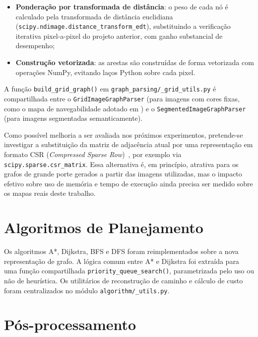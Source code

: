 \documentclass[
    12pt,
    openright,
    oneside,
    a4paper,
    english,
    brazil
]{abntex2}
\begin{document}
\begin{itemize}
    \item \textbf{Ponderação por transformada de distância}: o peso de cada nó é calculado pela transformada de distância euclidiana (\texttt{scipy.ndimage.distance\_transform\_edt}), substituindo a verificação iterativa pixel-a-pixel do projeto anterior, com ganho substancial de desempenho;
    \item \textbf{Construção vetorizada}: as arestas são construídas de forma vetorizada com operações NumPy, evitando laços Python sobre cada pixel.
\end{itemize}

A função \texttt{build\_grid\_graph()} em \texttt{graph\_parsing/\_grid\_utils.py} é compartilhada entre o \texttt{GridImageGraphParser} (para imagens com cores fixas, como o mapa de navegabilidade adotado em \cite{junior2025_rrt}) e o \texttt{SegmentedImageGraphParser} (para imagens segmentadas semanticamente).

Como possível melhoria a ser avaliada nos próximos experimentos, pretende-se investigar a substituição da matriz de adjacência atual por uma representação em formato CSR (\textit{Compressed Sparse Row})~\cite{saad2003}, por exemplo via \texttt{scipy.sparse.csr\_matrix}. Essa alternativa é, em princípio, atrativa para os grafos de grande porte gerados a partir das imagens utilizadas, mas o impacto efetivo sobre uso de memória e tempo de execução ainda precisa ser medido sobre os mapas reais deste trabalho.

\section{Algoritmos de Planejamento}

Os algoritmos A*, Dijkstra, BFS e DFS foram reimplementados sobre a nova representação de grafo. A lógica comum entre A* e Dijkstra foi extraída para uma função compartilhada \texttt{priority\_queue\_search()}, parametrizada pelo uso ou não de heurística. Os utilitários de reconstrução de caminho e cálculo de custo foram centralizados no módulo \texttt{algorithm/\_utils.py}.

\section{Pós-processamento}
\end{document}
